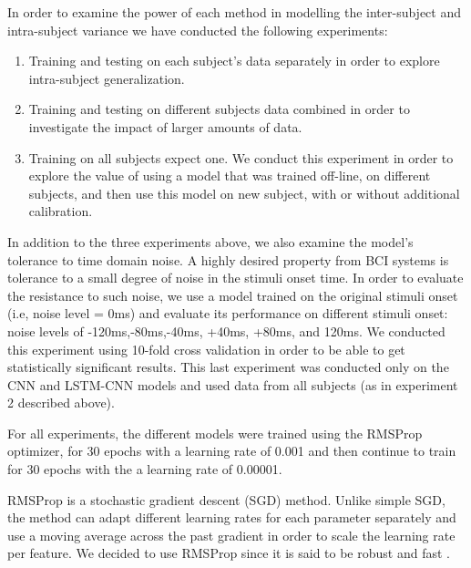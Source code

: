 \documentclass[
12pt, %
english, %
doublespacing, %
headsepline, %
]{MastersDoctoralThesis} %
\begin{document}
							
								
In order to examine the power of each method in modelling the inter-subject and  intra-subject variance we have conducted the following experiments:
\begin{enumerate}
	\item Training and testing on each subject's data separately in order to explore intra-subject generalization.
	\item Training and testing on different subjects data combined in order to investigate the impact of larger amounts of data.
	\item Training on all subjects expect one. We conduct this experiment in order to explore the value of using a model that was trained off-line, on different subjects, and then use this model on new subject, with or without additional calibration.
\end{enumerate}
									
In addition to the three experiments above, we also examine the model's tolerance to time domain noise. A highly desired property from BCI systems is tolerance to a small degree of noise in the stimuli onset time.  In order to evaluate the resistance to such noise, we use a model trained on the original stimuli onset (i.e, noise level = 0ms) and evaluate its performance on different stimuli onset: noise levels of -120ms,-80ms,-40ms, +40ms, +80ms, and 120ms. We conducted this experiment using 10-fold cross validation in order to be able to get statistically significant results. This last experiment was conducted only on the CNN and LSTM-CNN models and used data from all subjects (as in experiment 2 described above).

For all experiments, the different models were trained using the RMSProp~\cite{tieleman2012lecture} optimizer, for 30 epochs with a learning rate of 0.001 and then continue to train for 30 epochs with the a learning rate of 0.00001.

RMSProp \cite{tieleman2012lecture} is a stochastic gradient descent (SGD) method. Unlike simple SGD, the method can adapt different learning rates for each parameter separately and use a moving average across the past gradient in order to scale the learning rate per feature. We decided to use RMSProp since it is said to be robust and fast \cite{xu2015show, karpathy2015deep, szegedy2016rethinking}.
\end{document}
